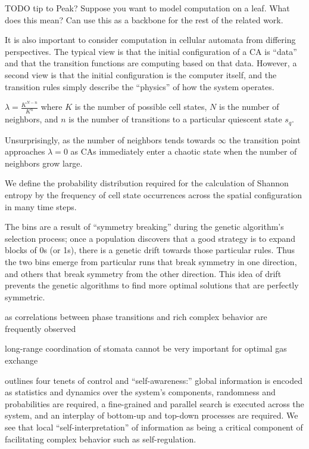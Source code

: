 TODO tip to Peak?
Suppose you want to model computation on a leaf. What does this mean? Can use this as a backbone for the rest of the related work.

It is also important to consider computation in cellular automata from differing perspectives. The typical view is that the initial configuration of a CA is “data” and that the transition functions are computing based on that data. However, a second view is that the initial configuration is the computer itself, and the transition rules simply describe the ``physics'' of how the system operates.

$\lambda=\frac{K^{N-n}}{K^n}$ where $K$ is the number of possible cell states, $N$ is the number of neighbors, and $n$ is the number of transitions to a particular quiescent state $s_q$.

Unsurprisingly, as the number of neighbors tends towards $\infty$ the transition point approaches $\lambda=0$ as CAs immediately enter a chaotic state when the number of neighbors grow large.

We define the probability distribution required for the calculation of Shannon entropy by the frequency of cell state occurrences across the spatial configuration in many time steps.

The bins are a result of ``symmetry breaking'' during the genetic algorithm’s selection process; once a population discovers that a good strategy is to expand blocks of 0s (or 1s), there is a genetic drift towards those particular rules. Thus the two bins emerge from particular runs that break symmetry in one direction, and others that break symmetry from the other direction. This idea of drift prevents the genetic algorithms to find more optimal solutions that are perfectly symmetric.

as correlations between phase transitions and rich complex behavior are frequently observed 

long-range coordination of stomata cannot be very important for optimal gas exchange

outlines four tenets of control and ``self-awareness:'' global information is encoded as statistics and dynamics over the system’s components, randomness and probabilities are required, a fine-grained and parallel search is executed across the system, and an interplay of bottom-up and top-down processes are required.  We see that local ``self-interpretation'' of information as being a critical component of facilitating complex behavior such as self-regulation. 

